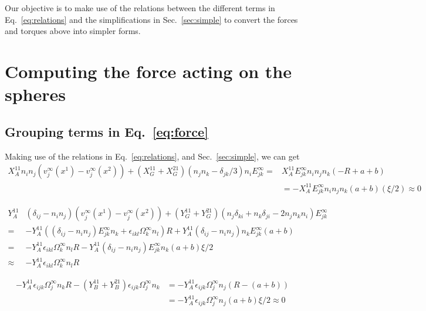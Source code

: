 \documentclass[reprint, amsmath,amssymb,aps,pre,onecolumn,notitlepage%
]{revtex4-1}
\begin{document}
Our objective is to make use of the relations between the different terms in Eq.~\eqref{eq:relations} and the simplifications in Sec.~\ref{sec:simple} to convert the forces and torques above into simpler forms.

\newpage
\section{Computing the force acting on the spheres}
\subsection{Grouping terms in Eq.~\eqref{eq:force}}
\label{sec:forcegroup}
Making use of the relations in Eq.~\eqref{eq:relations}, and Sec.~\ref{sec:simple}, we can get
\begin{equation}
\begin{split}
 X_A^{11}n_in_j(v_j^\infty(x^1)-v_j^\infty(x^2)) +(X_G^{11}+X_G^{21})(n_jn_k-\delta_{jk}/3)n_iE^\infty_{jk}=& X_A^{11}E^\infty_{jk}n_i n_j n_k  (-R+a+b)\\
 &=-X_A^{11} E^\infty_{jk}n_i n_j n_k (a+b) (\xi/2)\approx 0
\end{split}
\end{equation}


\begin{equation}
\begin{split}
Y_A^{11}&(\delta_{ij}-n_in_j)(v_j^\infty(x^1)-v_j^\infty(x^2)) +(Y_G^{11}+Y_G^{21})(n_j\delta_{ki}+n_k\delta_{ji}-2n_jn_kn_i)E^\infty_{jk} \\
=&-Y^{11}_A\left((\delta_{ij}-n_in_j)E^\infty_{jk}n_k +\epsilon_{ikl}\Omega^\infty_k n_l \right)R+Y_A^{11}(\delta_{ij}-n_in_j)n_kE^\infty_{jk}(a+b)\\
=&-Y^{11}_A\epsilon_{ikl}\Omega^\infty_k n_l R - Y^{11}_A(\delta_{ij}-n_in_j)E^\infty_{jk}n_k (a+b) \xi/2 \\
\approx&-Y^{11}_A\epsilon_{ikl}\Omega^\infty_k n_l R 
\end{split}
\end{equation}

\begin{equation}
\begin{split}
-Y^{11}_A\epsilon_{ijk}\Omega^\infty_j n_k R - (Y^{11}_B+Y^{21}_B)\epsilon_{ijk}\Omega^\infty_j n_k &=-Y^{11}_A\epsilon_{ijk}\Omega^\infty_j n_j (R-(a+b))\\
&=-Y^{11}_A\epsilon_{ijk}\Omega^\infty_j n_j(a+b) \xi/2 \approx 0
\end{split}
\end{equation}
\end{document}
